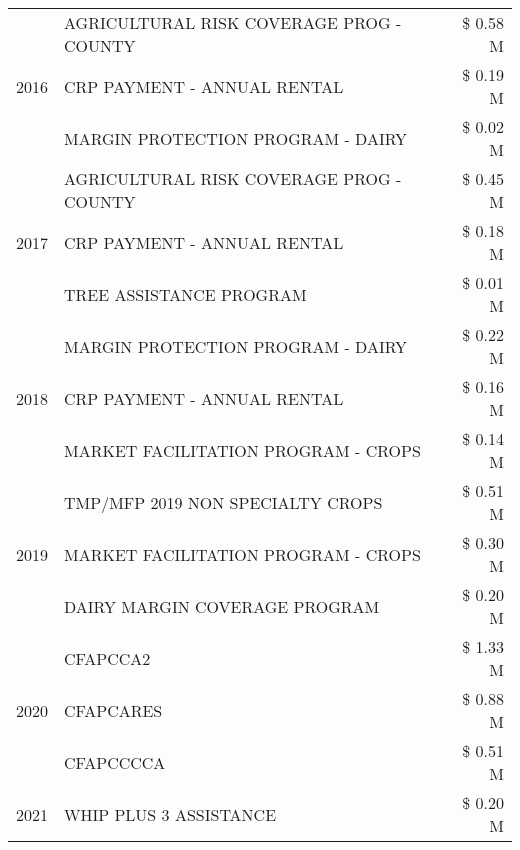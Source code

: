 \begin{tabular}{llr}
\multirow[t]{3}{*}{2016} & AGRICULTURAL RISK COVERAGE PROG - COUNTY & \$ 0.58 M \\
 & CRP PAYMENT - ANNUAL RENTAL & \$ 0.19 M \\
 & MARGIN PROTECTION PROGRAM - DAIRY & \$ 0.02 M \\
\cline{1-3}
\multirow[t]{3}{*}{2017} & AGRICULTURAL RISK COVERAGE PROG - COUNTY & \$ 0.45 M \\
 & CRP PAYMENT - ANNUAL RENTAL & \$ 0.18 M \\
 & TREE ASSISTANCE PROGRAM & \$ 0.01 M \\
\cline{1-3}
\multirow[t]{3}{*}{2018} & MARGIN PROTECTION PROGRAM - DAIRY & \$ 0.22 M \\
 & CRP PAYMENT - ANNUAL RENTAL & \$ 0.16 M \\
 & MARKET FACILITATION PROGRAM - CROPS & \$ 0.14 M \\
\cline{1-3}
\multirow[t]{3}{*}{2019} & TMP/MFP 2019 NON SPECIALTY CROPS & \$ 0.51 M \\
 & MARKET FACILITATION PROGRAM - CROPS & \$ 0.30 M \\
 & DAIRY MARGIN COVERAGE PROGRAM & \$ 0.20 M \\
\cline{1-3}
\multirow[t]{3}{*}{2020} & CFAPCCA2 & \$ 1.33 M \\
 & CFAPCARES & \$ 0.88 M \\
 & CFAPCCCCA & \$ 0.51 M \\
\cline{1-3}
2021 & WHIP PLUS 3 ASSISTANCE & \$ 0.20 M \\
\cline{1-3}
\bottomrule
\end{tabular}
